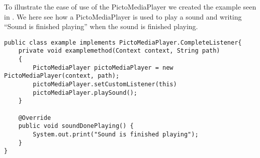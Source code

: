 To illustrate the ease of use of the PictoMediaPlayer we created the example seen in . 
We here see how a PictoMediaPlayer is used to play a sound and writing ``Sound is finished playing'' when the sound is finished playing.

\begin{lstlisting}[label=lst:mediaplayerexample, caption={Example of PictoMediaPlayer}]
public class example implements PictoMediaPlayer.CompleteListener{
    private void examplemethod(Context context, String path)
    {
        PictoMediaPlayer pictoMediaPlayer = new PictoMediaPlayer(context, path);
        pictoMediaPlayer.setCustomListener(this)
        pictoMediaPlayer.playSound();
    }

    @Override
    public void soundDonePlaying() {
        System.out.print("Sound is finished playing");
    }
}
\end{lstlisting}





